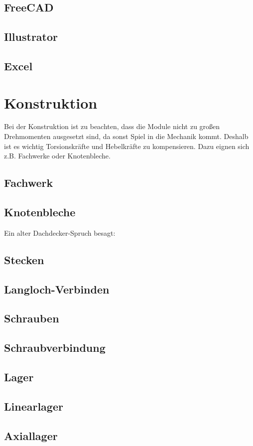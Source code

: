 \documentclass[
	a4paper,
	smallheadings,
	german,
	]
	{scrreprt}
\begin{document}
	\subsection{FreeCAD}
	\subsection{Illustrator}
	\subsection{Excel}
\section{Konstruktion}
Bei der Konstruktion ist zu beachten, dass die Module nicht zu großen Drehmomenten ausgesetzt sind, da sonst Spiel in die Mechanik kommt.
Deshalb ist es wichtig Torsionskräfte und Hebelkräfte zu kompensieren.
Dazu eignen sich z.B. Fachwerke oder Knotenbleche.
	\subsection{Fachwerk}
	\subsection{Knotenbleche}
Ein alter Dachdecker-Spruch besagt: 
	\subsection{Stecken}
	\subsection{Langloch-Verbinden}
	\subsection{Schrauben}
		\subsection{Schraubverbindung}
	\subsection{Lager}
		\subsection{Linearlager}
		\subsection{Axiallager}
\end{document}
